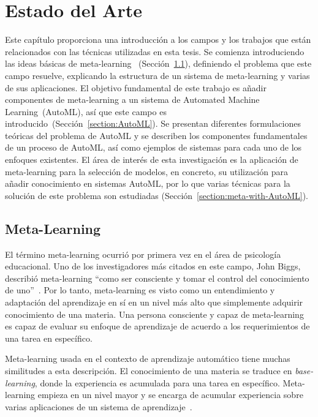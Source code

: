 \chapter{Estado del Arte}\label{chapter:state-of-the-art}

Este capítulo proporciona una introducción a los campos y los trabajos que
están relacionados con las técnicas utilizadas en esta tesis. Se comienza
introduciendo las ideas básicas de meta-learning~
(Sección~\ref{section:metalearning}), definiendo el problema que este campo
resuelve, explicando la estructura de un sistema de meta-learning y varias de
sus aplicaciones. El objetivo fundamental de este trabajo es añadir componentes
de meta-learning a un sistema de Automated Machine Learning~(AutoML), así que
este campo es introducido~(Sección~\ref{section:AutoML}). Se presentan
diferentes formulaciones teóricas del problema de AutoML y se describen los
componentes fundamentales de un proceso de AutoML, así como ejemplos de
sistemas para cada uno de los enfoques existentes. El área de interés de esta
investigación es la aplicación de meta-learning para la selección de modelos,
en concreto, su utilización para añadir conocimiento en sistemas AutoML, por
lo que varias técnicas para la solución de este problema son estudiadas
(Sección~\ref{section:meta-with-AutoML}).

\section{Meta-Learning}\label{section:metalearning}

El término meta-learning ocurrió por primera vez en el área de psicología
educacional. Uno de los investigadores más citados en este campo, John Biggs,
describió meta-learning ``como ser consciente y tomar el control del
conocimiento de uno''~. Por lo tanto, meta-learning
es visto como un entendimiento y adaptación del aprendizaje en sí en un nivel
más alto que simplemente adquirir conocimiento de una materia. Una persona
consciente y capaz de meta-learning es capaz de evaluar su enfoque de
aprendizaje de acuerdo a los requerimientos de una tarea en específico.

Meta-learning usada en el contexto de aprendizaje automático tiene muchas
similitudes a esta descripción. El conocimiento de una materia se traduce en
\textit{base-learning}, donde la experiencia es acumulada para una tarea en
específico. Meta-learning empieza en un nivel mayor y se encarga de acumular
experiencia sobre varias aplicaciones de un sistema de
aprendizaje~.

